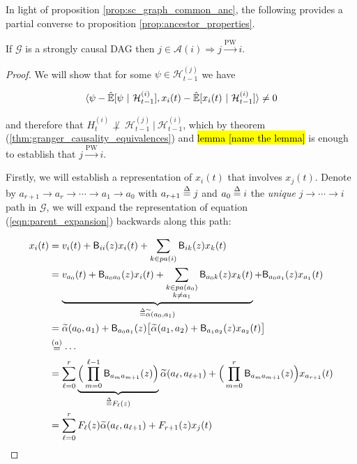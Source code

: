 \documentclass[12pt]{article}
\def\pwgc{\overset{\text{PW}}{\rightarrow}}  %
\def\gcg{\mathcal{G}}  %
\def\B{\mathsf{B}}  %
\def\H{\mathcal{H}}  %
\newcommand{\linE}[2]{\hat{\E}[#1\ |\ #2]}  %
\newcommand{\pa}[1]{pa(#1)}  %
\newcommand{\anc}[1]{\mathcal{A}(#1)}  %
\newcommand{\wtalpha}[2]{\widetilde{\alpha}(#1, #2)}  %
\newcommand{\gcgpath}[2]{#1 \rightarrow \cdots \rightarrow #2}  %
\begin{document}

In light of proposition \ref{prop:sc_graph_common_anc}, the following
provides a partial converse to proposition \ref{prop:ancestor_properties}.

\begin{proposition}
  \label{prop:pwgc_anc}
  If $\gcg$ is a strongly causal DAG then $j \in \anc{i} \Rightarrow j \pwgc i$.
\end{proposition}
\begin{proof}
  We will show that for some $\psi \in \H_{t - 1}^{(j)}$ we have

  \begin{equation}
    \label{eqn:cond_ortho_proof}
    \inner{\psi - \linE{\psi}{\H_{t - 1}^{(i)}}}{x_i(t) - \linE{x_i(t)}{\H_{t - 1}^{(i)}}} \ne 0
  \end{equation}

  and therefore that $H_t^{(i)} \not\perp\ \H_{t - 1}^{(j)}\ |\ \H_{t - 1}^{(i)}$, which by theorem (\ref{thm:granger_causality_equivalences}) and \hl{lemma [name the lemma]} is enough to establish that $j \pwgc i$.

  Firstly, we will establish a representation of $x_i(t)$ that involves $x_j(t)$.  Denote by $a_{r + 1} \rightarrow a_r \rightarrow \cdots \rightarrow a_1 \rightarrow a_0$ with $a_{r + 1} \overset{\Delta}{=} j$ and $a_0 \overset{\Delta}{=} i$ the \textit{unique} $\gcgpath{j}{i}$ path in $\gcg$, we will expand the representation of equation (\ref{eqn:parent_expansion}) backwards along this path:

  \begin{align*}
    x_i(t) &= v_i(t) + \B_{ii}(z) x_i(t) + \sum_{k \in \pa{i}}\B_{ik}(z) x_k(t)\\
           &= \underbrace{v_{a_0}(t) + \B_{a_0a_0}(z) x_i(t) + \sum_{\substack{k \in \pa{a_0} \\ k \ne a_1}}\B_{a_0 k}(z) x_k(t)}_{\defeq \wtalpha{a_0}{a_1}} + \B_{a_0a_1}(z)x_{a_1}(t)\\
           &= \wtalpha{a_0}{a_1} + \B_{a_0a_1}(z)\big[\wtalpha{a_1}{a_2} + \B_{a_1a_2}(z)x_{a_2}(t) \big]\\
           &\overset{(a)}{=} \cdots\\
           &= \sum_{\ell = 0}^r \underbrace{\Big(\prod_{m = 0}^{\ell - 1} \B_{a_m a_{m + 1}}(z) \Big)}_{\defeq F_\ell(z)} \wtalpha{a_\ell}{a_{\ell + 1}} + \Big(\prod_{m = 0}^{r}\B_{a_m a_{m + 1}}(z)\Big)x_{a_{r + 1}}(t)\\
           &= \sum_{\ell = 0}^r F_\ell(z) \wtalpha{a_\ell}{a_{\ell + 1}} + F_{r + 1}(z) x_j(t)
  \end{align*}


\end{proof}
\end{document}
